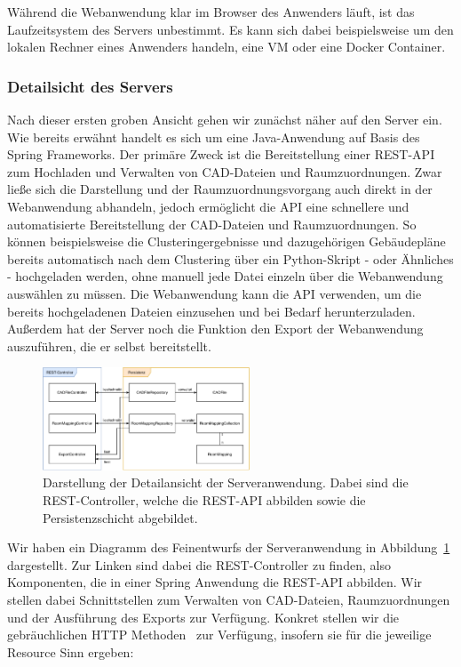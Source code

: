 Während die Webanwendung klar im Browser des Anwenders läuft, ist das Laufzeitsystem des Servers unbestimmt.
Es kann sich dabei beispielsweise um den lokalen Rechner eines Anwenders handeln, eine VM oder eine Docker Container.

\subsubsection{Detailsicht des Servers}
\label{subsubsec:detail-server}

Nach dieser ersten groben Ansicht gehen wir zunächst näher auf den Server ein.
Wie bereits erwähnt handelt es sich um eine Java-Anwendung auf Basis des Spring Frameworks.
Der primäre Zweck ist die Bereitstellung einer REST-API zum Hochladen und Verwalten von CAD-Dateien und Raumzuordnungen.
Zwar ließe sich die Darstellung und der Raumzuordnungsvorgang auch direkt in der Webanwendung abhandeln, jedoch ermöglicht die API eine schnellere und automatisierte Bereitstellung der CAD-Dateien und Raumzuordnungen.
So können beispielsweise die Clusteringergebnisse und dazugehörigen Gebäudepläne bereits automatisch nach dem Clustering über ein Python-Skript - oder Ähnliches - hochgeladen werden, ohne manuell jede Datei einzeln über die Webanwendung auswählen zu müssen.
Die Webanwendung kann die API verwenden, um die bereits hochgeladenen Dateien einzusehen und bei Bedarf herunterzuladen.
Außerdem hat der Server noch die Funktion den Export der Webanwendung auszuführen, die er selbst bereitstellt.

\begin{figure}[h]
    \includegraphics[width=0.55\textwidth]{res/server-architecture.pdf}
    \caption{Darstellung der Detailansicht der Serveranwendung.
    Dabei sind die REST-Controller, welche die REST-API abbilden sowie die Persistenzschicht abgebildet.}
    \label{fig:detail-view-server}
\end{figure}

Wir haben ein Diagramm des Feinentwurfs der Serveranwendung in Abbildung~\ref{fig:detail-view-server} dargestellt.
Zur Linken sind dabei die REST-Controller zu finden, also Komponenten, die in einer Spring Anwendung die REST-API abbilden.
Wir stellen dabei Schnittstellen zum Verwalten von CAD-Dateien, Raumzuordnungen und der Ausführung des Exports zur Verfügung.
Konkret stellen wir die gebräuchlichen HTTP Methoden~\cite{MozillaHTTPMethods} zur Verfügung, insofern sie für die jeweilige Resource Sinn ergeben:


